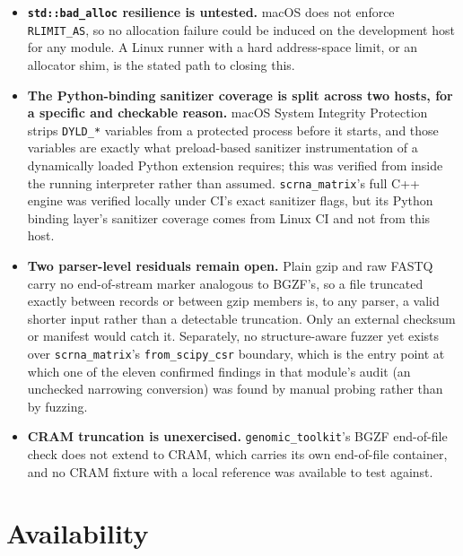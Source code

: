\documentclass[10pt,twocolumn]{article}
\begin{document}
\begin{itemize}
\item \textbf{\texttt{std::bad\_alloc} resilience is untested.} macOS does not
  enforce \texttt{RLIMIT\_AS}, so no allocation failure could be induced on
  the development host for any module. A Linux runner with a hard
  address-space limit, or an allocator shim, is the stated path to closing
  this.

\item \textbf{The Python-binding sanitizer coverage is split across two hosts,
  for a specific and checkable reason.} macOS System Integrity Protection
  strips \texttt{DYLD\_*} variables from a protected process before it starts,
  and those variables are exactly what preload-based sanitizer instrumentation
  of a dynamically loaded Python extension requires; this was verified from
  inside the running interpreter rather than assumed.
  \texttt{scrna\_matrix}'s full C++ engine was verified locally under CI's
  exact sanitizer flags, but its Python binding layer's sanitizer coverage
  comes from Linux CI and not from this host.

\item \textbf{Two parser-level residuals remain open.} Plain gzip and raw
  FASTQ carry no end-of-stream marker analogous to BGZF's, so a file
  truncated exactly between records or between gzip members is, to any
  parser, a valid shorter input rather than a detectable truncation. Only an
  external checksum or manifest would catch it. Separately, no
  structure-aware fuzzer yet exists over \texttt{scrna\_matrix}'s
  \texttt{from\_scipy\_csr} boundary, which is the entry point at which one of
  the eleven confirmed findings in that module's audit (an unchecked
  narrowing conversion) was found by manual probing rather than by fuzzing.

\item \textbf{CRAM truncation is unexercised.} \texttt{genomic\_toolkit}'s
  BGZF end-of-file check does not extend to CRAM, which carries its own
  end-of-file container, and no CRAM fixture with a local reference was
  available to test against.

\end{itemize}

\section{Availability}
\end{document}
